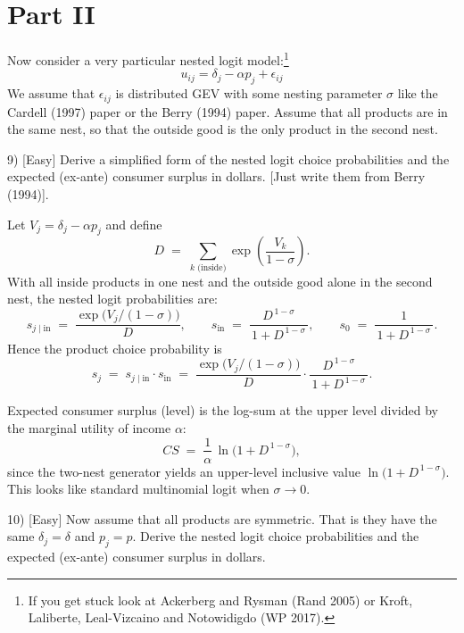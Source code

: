 \documentclass{article}
\begin{document}
\section*{Part II}

\begin{tcolorbox}
Now consider a very particular nested logit model:\footnote{If you get stuck look at Ackerberg and Rysman (Rand 2005) or Kroft, Laliberte, Leal-Vizcaino and Notowidigdo (WP 2017).}
\[
u_{ij} = \delta_j - \alpha p_j + \epsilon_{ij}
\]
We assume that $\epsilon_{ij}$ is distributed GEV with some nesting parameter $\sigma$ like the Cardell (1997) paper or the Berry (1994) paper. Assume that all products are in the same nest, so that the outside good is the only product in the second nest.
\end{tcolorbox}

\begin{tcolorbox}
9) [Easy] Derive a simplified form of the nested logit choice probabilities and the expected (ex-ante) consumer surplus in dollars. [Just write them from Berry (1994)].
\end{tcolorbox}

Let $V_j=\delta_j-\alpha p_j$ and define
\[
D \;=\; \sum_{k \text{ (inside)}} \exp\!\left(\frac{V_k}{1-\sigma}\right).
\]
With all inside products in one nest and the outside good alone in the second nest, the nested logit probabilities are:
\[
s_{j\mid \text{in}} \;=\; \frac{\exp\!\big(V_j/(1-\sigma)\big)}{D}, 
\qquad
s_{\text{in}} \;=\; \frac{D^{\,1-\sigma}}{\,1+D^{\,1-\sigma}\,}, 
\qquad
s_{0} \;=\; \frac{1}{\,1+D^{\,1-\sigma}\,}.
\]
Hence the product choice probability is
\[
s_j \;=\; s_{j\mid \text{in}}\cdot s_{\text{in}}
\;=\; 
\frac{\exp\!\big(V_j/(1-\sigma)\big)}{D}\cdot 
\frac{D^{\,1-\sigma}}{\,1+D^{\,1-\sigma}\,}.
\]


Expected consumer surplus (level) is the log-sum at the upper level divided by the
marginal utility of income $\alpha$:
\[
CS \;=\; \frac{1}{\alpha}\,\ln\!\big(1 + D^{\,1-\sigma}\big),
\]
since the two-nest generator yields an upper-level inclusive value $\ln\!\big(1 + D^{\,1-\sigma}\big)$. This looks like standard multinomial logit when $\sigma\to 0$.


\begin{tcolorbox}
10) [Easy] Now assume that all products are symmetric. That is they have the same $\delta_j = \delta$ and $p_j = p$. Derive the nested logit choice probabilities and the expected (ex-ante) consumer surplus in dollars.
\end{tcolorbox}
\end{document}
